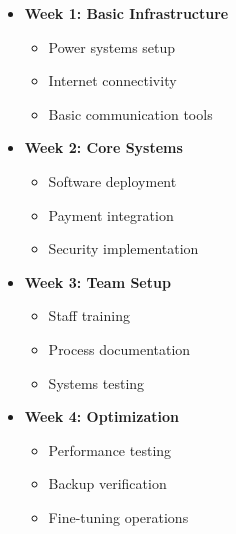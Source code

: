 \begin{tcolorbox}[colback=white,colframe=primarydark,title=\textbf{Implementation Schedule}]
\begin{itemize}
    \item \textbf{Week 1: Basic Infrastructure}
    \begin{itemize}
        \item Power systems setup
        \item Internet connectivity
        \item Basic communication tools
    \end{itemize}

    \item \textbf{Week 2: Core Systems}
    \begin{itemize}
        \item Software deployment
        \item Payment integration
        \item Security implementation
    \end{itemize}

    \item \textbf{Week 3: Team Setup}
    \begin{itemize}
        \item Staff training
        \item Process documentation
        \item Systems testing
    \end{itemize}

    \item \textbf{Week 4: Optimization}
    \begin{itemize}
        \item Performance testing
        \item Backup verification
        \item Fine-tuning operations
    \end{itemize}
\end{itemize}
\end{tcolorbox}

